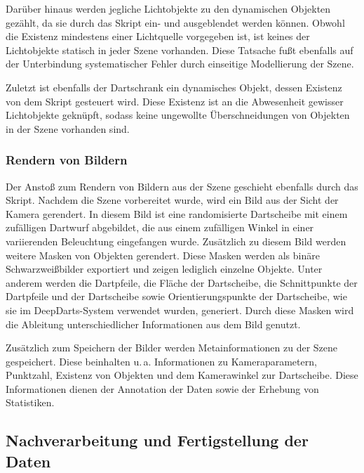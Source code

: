 Darüber hinaus werden jegliche Lichtobjekte zu den dynamischen Objekten gezählt, da sie durch das Skript ein- und ausgeblendet werden können. Obwohl die Existenz mindestens einer Lichtquelle vorgegeben ist, ist keines der Lichtobjekte statisch in jeder Szene vorhanden. Diese Tatsache fußt ebenfalls auf der Unterbindung systematischer Fehler durch einseitige Modellierung der Szene.

Zuletzt ist ebenfalls der Dartschrank ein dynamisches Objekt, dessen Existenz von dem Skript gesteuert wird. Diese Existenz ist an die Abwesenheit gewisser Lichtobjekte geknüpft, sodass keine ungewollte Überschneidungen von Objekten in der Szene vorhanden sind.

\subsubsection{Rendern von Bildern}

Der Anstoß zum Rendern von Bildern aus der Szene geschieht ebenfalls durch das Skript. Nachdem die Szene vorbereitet wurde, wird ein Bild aus der Sicht der Kamera gerendert. In diesem Bild ist eine randomisierte Dartscheibe mit einem zufälligen Dartwurf abgebildet, die aus einem zufälligen Winkel in einer variierenden Beleuchtung eingefangen wurde. Zusätzlich zu diesem Bild werden weitere Masken von Objekten gerendert. Diese Masken werden als binäre Schwarzweißbilder exportiert und zeigen lediglich einzelne Objekte. Unter anderem werden die Dartpfeile, die Fläche der Dartscheibe, die Schnittpunkte der Dartpfeile und der Dartscheibe sowie Orientierungspunkte der Dartscheibe, wie sie im DeepDarts-System verwendet wurden, generiert. Durch diese Masken wird die Ableitung unterschiedlicher Informationen aus dem Bild genutzt.

Zusätzlich zum Speichern der Bilder werden Metainformationen zu der Szene gespeichert. Diese beinhalten u.\,a. Informationen zu Kameraparametern, Punktzahl, Existenz von Objekten und dem Kamerawinkel zur Dartscheibe. Diese Informationen dienen der Annotation der Daten sowie der Erhebung von Statistiken.


\subsection{Nachverarbeitung und Fertigstellung der Daten}  %
\label{sec:methodik_postprocessing}

